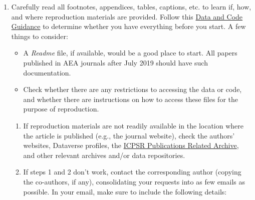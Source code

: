 \documentclass[]{book}
\providecommand{\tightlist}{%
  \setlength{\itemsep}{0pt}\setlength{\parskip}{0pt}}
\begin{document}
\begin{enumerate}
\def\labelenumi{\arabic{enumi}.}
\tightlist
\item
  Carefully read all footnotes, appendices, tables, captions, etc. to learn if, how, and where reproduction materials are provided. Follow this \href{https://social-science-data-editors.github.io/guidance/Verification_guidance.html}{Data and Code Guidance} to determine whether you have everything before you start. A few things to consider:

  \begin{itemize}
  \tightlist
  \item
    A \emph{Readme} file, if available, would be a good place to start. All papers published in AEA journals after July 2019 should have such documentation.\\
  \item
    Check whether there are any restrictions to accessing the data or code, and whether there are instructions on how to access these files for the purpose of reproduction.
  \end{itemize}

  \begin{enumerate}
  \def\labelenumii{\arabic{enumii}.}
  \setcounter{enumii}{1}
  \item
    If reproduction materials are not readily available in the location where the article is published (e.g., the journal website), check the authors' websites, Dataverse profiles, the \href{https://www.icpsr.umich.edu/icpsrweb/}{ICPSR Publications Related Archive}, and other relevant archives and/or data repositories.
  \item
    If steps 1 and 2 don't work, contact the corresponding author (copying the co-authors, if any), consolidating your requests into as few emails as possible. In your email, make sure to include the following details:


\end{enumerate}
\end{enumerate}
\end{document}
